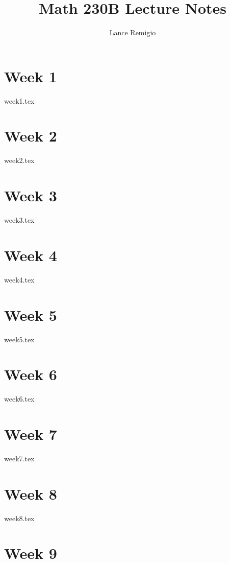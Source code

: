 \documentclass[a4paper]{book}
\title{Math 230B Lecture Notes}
\author{Lance Remigio}
\begin{document}
\maketitle

\chapter{Week 1}

{week1.tex}

\chapter{Week 2}

{week2.tex}

\chapter{Week 3}

{week3.tex}

\chapter{Week 4}

{week4.tex}

\chapter{Week 5}

{week5.tex}

\chapter{Week 6}

{week6.tex}

\chapter{Week 7}

{week7.tex}

\chapter{Week 8}

{week8.tex}

\chapter{Week 9}
\end{document}
